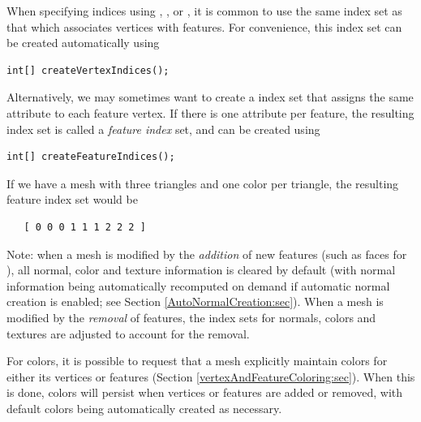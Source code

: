 When specifying indices using 
,
, or
,
it is common to use the same index set as that which
associates vertices with features. For convenience,
this index set can be created automatically using
\begin{lstlisting}[]
   int[] createVertexIndices();
\end{lstlisting}
%
Alternatively, we may sometimes want to create a index set
that assigns the same attribute to each feature vertex. If
there is one attribute per feature, the resulting
index set is called a {\it feature index} set, and
can be created using
\begin{lstlisting}[]
   int[] createFeatureIndices();
\end{lstlisting}
%
If we have a mesh with three triangles and one color per
triangle, the resulting feature index set would be
%
\begin{verbatim}
   [ 0 0 0 1 1 1 2 2 2 ]
\end{verbatim}
%

\begin{sideblock}
Note: when a mesh is modified by the {\it addition} of new features
(such as faces for ), all
normal, color and texture information is cleared by default (with
normal information being automatically recomputed on demand if
automatic normal creation is enabled; see Section \ref{AutoNormalCreation:sec}).
When a mesh is modified by the {\it removal} of
features, the index sets for normals, colors and textures are adjusted
to account for the removal.

For colors, it is possible to request that a mesh explicitly maintain
colors for either its vertices or features (Section
\ref{vertexAndFeatureColoring:sec}). When this is done, colors will
persist when vertices or features are added or removed, with default
colors being automatically created as necessary.
\end{sideblock}

